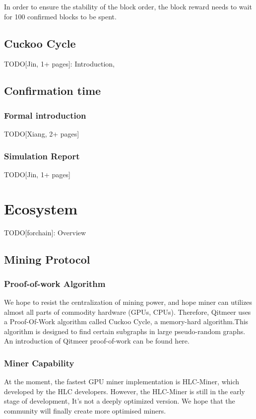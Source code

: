 \documentclass[a4paper,11pt]{article}
\begin{document}
In order to ensure the stability of the block order, the block reward needs to wait for 100 confirmed blocks to be spent.

\subsection{Cuckoo Cycle}
TODO[Jin, 1+ pages]: Introduction, 

\subsection{Confirmation time}
\subsubsection{Formal introduction}
TODO[Xiang, 2+ pages]
\subsubsection{Simulation Report}
TODO[Jin, 1+ pages]

\section{Ecosystem}
TODO[forchain]: Overview

\subsection{Mining Protocol}
\subsubsection{Proof-of-work Algorithm}

We hope to resist the centralization of mining power, and hope miner can utilizes almost all parts of commodity hardware (GPUs, CPUs).
Therefore, Qitmeer uses a Proof-Of-Work algorithm called Cuckoo Cycle\cite{cuckoocycle}, 
a memory-hard algorithm.This algorithm is designed to find certain subgraphs in large pseudo-random graphs. 
An introduction of Qitmeer proof-of-work can be found here.\cite{qitmeerpow} 

\subsubsection{Miner Capability}

At the moment, the fastest GPU miner implementation is HLC-Miner, which developed by the HLC developers. 
However, the HLC-Miner is still in the early stage of development, It's not a deeply optimized version. We hope 
that the community will finally create more optimised miners.
\end{document}
